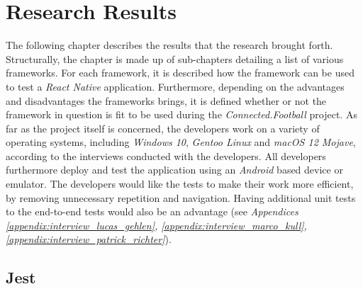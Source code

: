 \section{Research Results}
\label{sec:research_results}

The following chapter describes the results that the research brought forth. Structurally, the chapter is made up of sub-chapters detailing a list of various frameworks.
\newline
For each framework, it is described how the framework can be used to test a \textit{React Native} application. Furthermore, depending on the advantages and disadvantages the frameworks brings, it is defined whether or not the framework in question is fit to be used during the \textit{Connected.Football} project.
\newline
As far as the project itself is concerned, the developers work on a variety of operating systems, including \textit{Windows 10}, \textit{Gentoo Linux} and \textit{macOS 12 Mojave}, according to the interviews conducted with the developers. All developers furthermore deploy and test the application using an \textit{Android} based device or emulator. The developers would like the tests to make their work more efficient, by removing unnecessary repetition and navigation. Having additional unit tests to the end-to-end tests would also be an advantage (see \textit{Appendices \ref{appendix:interview_lucas_gehlen}, \ref{appendix:interview_marco_kull}, \ref{appendix:interview_patrick_richter}}).

\subsection{Jest}
\label{ssec:jest}

